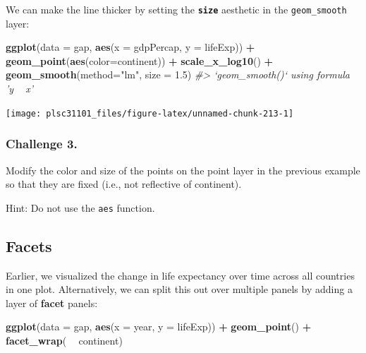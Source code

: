 \documentclass[]{book}
\newenvironment{Shaded}{\begin{snugshade}}{\end{snugshade}}
\newcommand{\KeywordTok}[1]{\textcolor[rgb]{0.13,0.29,0.53}{\textbf{#1}}}
\newcommand{\DataTypeTok}[1]{\textcolor[rgb]{0.13,0.29,0.53}{#1}}
\newcommand{\FloatTok}[1]{\textcolor[rgb]{0.00,0.00,0.81}{#1}}
\newcommand{\StringTok}[1]{\textcolor[rgb]{0.31,0.60,0.02}{#1}}
\newcommand{\CommentTok}[1]{\textcolor[rgb]{0.56,0.35,0.01}{\textit{#1}}}
\newcommand{\OperatorTok}[1]{\textcolor[rgb]{0.81,0.36,0.00}{\textbf{#1}}}
\newcommand{\NormalTok}[1]{#1}
\begin{document}
We can make the line thicker by setting the \textbf{\texttt{size}}
aesthetic in the \texttt{geom\_smooth} layer:

\begin{Shaded}
\begin{Highlighting}[]
\KeywordTok{ggplot}\NormalTok{(}\DataTypeTok{data =}\NormalTok{ gap, }\KeywordTok{aes}\NormalTok{(}\DataTypeTok{x =}\NormalTok{ gdpPercap, }\DataTypeTok{y =}\NormalTok{ lifeExp)) }\OperatorTok{+}\StringTok{ }
\StringTok{  }\KeywordTok{geom_point}\NormalTok{(}\KeywordTok{aes}\NormalTok{(}\DataTypeTok{color=}\NormalTok{continent)) }\OperatorTok{+}\StringTok{ }
\StringTok{  }\KeywordTok{scale_x_log10}\NormalTok{() }\OperatorTok{+}\StringTok{ }
\StringTok{  }\KeywordTok{geom_smooth}\NormalTok{(}\DataTypeTok{method=}\StringTok{"lm"}\NormalTok{, }\DataTypeTok{size =} \FloatTok{1.5}\NormalTok{)}
\CommentTok{#> `geom_smooth()` using formula 'y ~ x'}
\end{Highlighting}
\end{Shaded}

\begin{center}\texttt{[image: plsc31101\_files/figure-latex/unnamed-chunk-213-1]} \end{center}

\subsubsection*{Challenge 3.}\label{challenge-3.-3}

Modify the color and size of the points on the point layer in the
previous example so that they are fixed (i.e., not reflective of
continent).

Hint: Do not use the \texttt{aes} function.

\subsection{Facets}\label{facets}

Earlier, we visualized the change in life expectancy over time across
all countries in one plot. Alternatively, we can split this out over
multiple panels by adding a layer of \textbf{facet} panels:

\begin{Shaded}
\begin{Highlighting}[]
\KeywordTok{ggplot}\NormalTok{(}\DataTypeTok{data =}\NormalTok{ gap, }\KeywordTok{aes}\NormalTok{(}\DataTypeTok{x =}\NormalTok{ year, }\DataTypeTok{y =}\NormalTok{ lifeExp)) }\OperatorTok{+}
\StringTok{  }\KeywordTok{geom_point}\NormalTok{() }\OperatorTok{+}\StringTok{ }
\StringTok{  }\KeywordTok{facet_wrap}\NormalTok{( }\OperatorTok{~}\StringTok{ }\NormalTok{continent)}
\end{Highlighting}
\end{Shaded}
\end{document}
